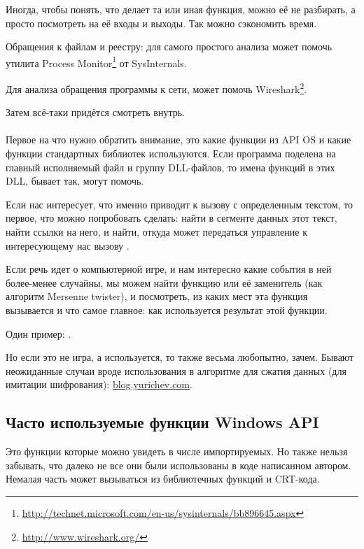 
Иногда, чтобы понять, что делает та или иная функция, можно её не разбирать, а просто посмотреть на её входы и выходы.
Так можно сэкономить время.

Обращения к файлам и реестру: 
для самого простого анализа может помочь утилита Process Monitor\footnote{\url{http://technet.microsoft.com/en-us/sysinternals/bb896645.aspx}}
от SysInternals.

Для анализа обращения программы к сети, может помочь  Wireshark\footnote{\url{http://www.wireshark.org/}}.

Затем всё-таки придётся смотреть внутрь. \\
\\
Первое на что нужно обратить внимание, это какие функции из \ac{API} \ac{OS}
и какие функции стандартных библиотек используются.
Если программа поделена на главный исполняемый файл и группу DLL-файлов, то имена функций в этих DLL, бывает так, могут помочь.

Если нас интересует, что именно приводит к вызову  с определенным текстом, 
то первое, что можно попробовать сделать: найти в сегменте данных этот текст, найти ссылки на него, и найти, 
откуда может передаться управление к интересующему нас вызову .

Если речь идет о компьютерной игре, и нам интересно какие события в ней более-менее случайны, 
мы можем найти функцию \rand или её заменитель (как алгоритм Mersenne twister), и посмотреть, 
из каких мест эта функция вызывается и что самое главное: как используется результат этой функции.%

Один пример: . 

Но если это не игра, а \rand используется, то также весьма любопытно, зачем. 
Бывают неожиданные случаи вроде использования \rand в алгоритме для сжатия данных (для имитации шифрования):
\href{http://blog.yurichev.com/node/44}{blog.yurichev.com}.

\subsection{Часто используемые функции Windows API}

Это функции которые можно увидеть в числе импортируемых.
Но также нельзя забывать, что далеко не все они были использованы в коде написанном автором.
Немалая часть может вызываться из библиотечных функций и \ac{CRT}-кода.
	

